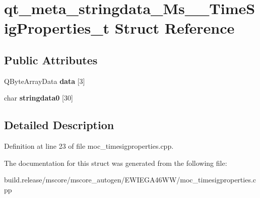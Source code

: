\hypertarget{structqt__meta__stringdata___ms_____time_sig_properties__t}{}\section{qt\+\_\+meta\+\_\+stringdata\+\_\+\+Ms\+\_\+\+\_\+\+Time\+Sig\+Properties\+\_\+t Struct Reference}
\label{structqt__meta__stringdata___ms_____time_sig_properties__t}
\subsection*{Public Attributes}
\begin{DoxyCompactItemize}
\item 
\mbox{\label{structqt__meta__stringdata___ms_____time_sig_properties__t_a07c97bbe3e88c38599711e1133095944}} 
Q\+Byte\+Array\+Data {\bfseries data} \mbox{[}3\mbox{]}
\item 
\mbox{\label{structqt__meta__stringdata___ms_____time_sig_properties__t_ad3dd380a803678a6f7b7ae2f5c96175a}} 
char {\bfseries stringdata0} \mbox{[}30\mbox{]}
\end{DoxyCompactItemize}


\subsection{Detailed Description}


Definition at line 23 of file moc\+\_\+timesigproperties.\+cpp.



The documentation for this struct was generated from the following file\+:\begin{DoxyCompactItemize}
\item 
build.\+release/mscore/mscore\+\_\+autogen/\+E\+W\+I\+E\+G\+A46\+W\+W/moc\+\_\+timesigproperties.\+cpp\end{DoxyCompactItemize}
